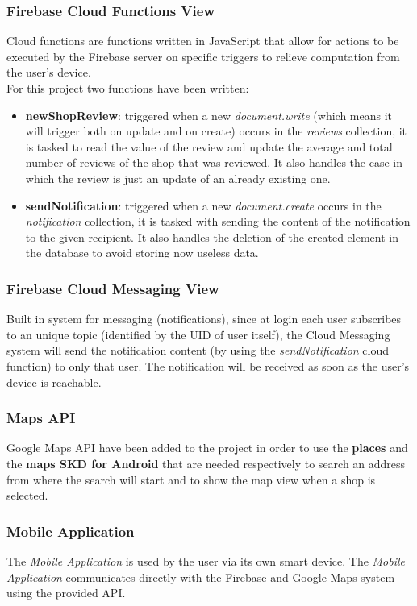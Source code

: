 \subsubsection{Firebase Cloud Functions View}
Cloud functions are functions written in JavaScript that allow for actions to be executed by the Firebase server on specific triggers to relieve computation from the user's device.\\
For this project two functions have been written:
\begin{itemize}
\item \textbf{newShopReview}: triggered when a new \textit{document.write} (which means it will trigger both on update and on create) occurs in the \textit{reviews} collection, it is tasked to read the value of the review and update the average and total number of reviews of the shop that was reviewed. It also handles the case in which the review is just an update of an already existing one.
\item \textbf{sendNotification}: triggered when a new \textit{document.create} occurs in the \textit{notification} collection, it is tasked with sending the content of the notification to the given recipient. It also handles the deletion of the created element in the database to avoid storing now useless data.
\end{itemize}
\subsubsection{Firebase Cloud Messaging View}
Built in system for messaging (notifications), since at login each user subscribes to an unique topic (identified by the UID of user itself), the Cloud Messaging system will send the notification content (by using the \textit{sendNotification} cloud function) to only that user. The notification will be received as soon as the user's device is reachable.
\subsubsection{Maps API}
Google Maps API have been added to the project in order to use the \textbf{places} and the \textbf{maps SKD for Android} that are needed respectively to search an address from where the search will start and to show the map view when a shop is selected.
\subsubsection{Mobile Application}
The \emph{Mobile Application} is used by the user via its own smart device. The \emph{Mobile Application} communicates directly with the Firebase and Google Maps system using the provided API.

